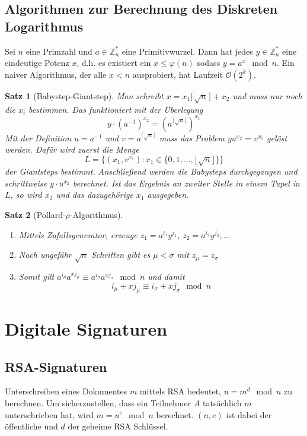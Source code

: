 \documentclass[a4paper, 12pt]{article}
\theoremstyle{plain}
\newtheorem{theorem}{Satz}[subsection] %
\theoremstyle{definition}
\theoremstyle{lemma}
\theoremstyle{remark}
\theoremstyle{corollary}
\theoremstyle{example}
\begin{document}
	\subsection{Algorithmen zur Berechnung des Diskreten Logarithmus}
	Sei $n$ eine Primzahl und $a \in \mathbb{Z}_n^*$ eine Primitivwurzel. Dann hat jedes $y \in \mathbb{Z}_n^*$ eine eindeutige Potenz $x$, d.h. es existiert ein $x \leq \varphi(n)$ sodass $y=a^x \mod n$. Ein naiver Algorithmus, der alle $x<n$ ausprobiert, hat Laufzeit $\mathcal{O}(2^k)$.
	\begin{theorem}[Babystep-Giantstep]
		Man schreibt $x = x_1 \lceil\sqrt{n}\rceil + x_2$ und muss nur noch die $x_i$ bestimmen. Das funktioniert mit der Überlegung \[y\cdot \left(a^{-1}\right)^{x_2} = \left(a^{\lceil\sqrt{n}\rceil}\right)^{x_1}\]
		Mit der Definition $u = a^{-1}$ und $v = a^{\lceil\sqrt{n}\rceil}$ muss das Problem $yu^{x_2} = v^{x_1}$ gelöst werden. Dafür wird zuerst die Menge \[L = \{(x_1,v^{x_1}) : x_1 \in \{0,1,...,\lfloor\sqrt{n}\rfloor\}\}\] der Giantsteps bestimmt. Anschließend werden die Babysteps durchgegangen und schrittweise $y\cdot u^{x_2}$ berechnet. Ist das Ergebnis an zweiter Stelle in einem Tupel in $L$, so wird $x_2$ und das dazugehörige $x_1$ ausgegeben.
	\end{theorem}
	\begin{theorem}[Pollard-$\rho$-Algorithmus]
		\begin{enumerate}
			\item Mittels Zufallsgenerator, erzeuge $z_1 = a^{i_1}y^{j_1}$, $z_2 = a^{i_2}y^{j_2}, ...$
			\item Nach ungefähr $\sqrt{n}$ Schritten gibt es $\mu < \sigma$ mit $z_\mu = z_\sigma$
			\item Somit gilt $a^{i_\mu}a^{xj_\mu} \equiv a^{i_\sigma}a^{xj_\sigma} \mod n$ und damit \[i_\mu + xj_\mu \equiv i_\sigma + xj_\sigma \mod n\]
		\end{enumerate}
	\end{theorem}
\section{Digitale Signaturen}
	\subsection{RSA-Signaturen}
	Unterschreiben eines Dokumentes $m$ mittels RSA bedeutet, $u = m^d \mod n$ zu berechnen. Um sicherzustellen, dass ein Teilnehmer $A$ tatsächlich $m$ unterschrieben hat, wird $m = u^e \mod n$ berechnet. $(n,e)$ ist dabei der öffentliche und $d$ der geheime RSA Schlüssel.
\end{document}
